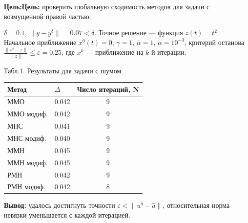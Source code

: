 \documentclass[10pt,pdf, mathserif, hyperref={unicode}]{beamer}
\begin{document}
\begin{frame}{}
	{\textbf{\color{blue}Цель:}}{\textbf{\color{blue}Цель:}} проверить глобальную сходимость методов для задачи с возмущенной правой частью.
	
	$\delta=0.1$, $\|y-y^{\delta}\|=0.07<\delta$. Точное решение --- функция $z(t)=t^2$. Начальное приближение $x^0(t)=0$, $\gamma=1$, $\bar\alpha=1$, $\alpha=10^{-3}$, критерий останова $\frac{\|x^k-z\|}{\|z\|}\le\varepsilon=0.25$, где $x^k$ --- приближение на $k$-й итерации. 
	\begin{table}[H]
		\centering
		{\scriptsize Табл.1. Результаты для задачи с шумом}
		\begin{tabular}{|l|c|c|}
			\hline
			\textbf{Метод}                   & \multicolumn{1}{l|}{\textbf{$\Delta$}} & \multicolumn{1}{l|}{\textbf{Число итераций, N}} \\ \hline
			ММО                              & 0.042                                  & 9                                               \\ \hline
			\multicolumn{1}{|r|}{ММО модиф.} & 0.042                                  & 9                                               \\ \hline
			МНС                              & 0.041                                  & 9                                               \\ \hline
			МНС модиф.                       & 0.040                                  & 9                                               \\ \hline
			ММН                              & 0.045                                  & 9                                               \\ \hline
			ММН модиф.                       & 0.045                                  & 9                                               \\ \hline
			РМН                              & 0.042                                  & 9                                               \\ \hline
			РМН модиф.                       & 0.042                                  & 8                                               \\ \hline
		\end{tabular}
	\end{table}
	{\textbf{\color{blue}Вывод:}} удалось достигнуть точности $\varepsilon<\|u^\delta-\hat{u}\|$, относительная норма невязки уменьшается с каждой итерацией.
\end{frame}
\end{document}
